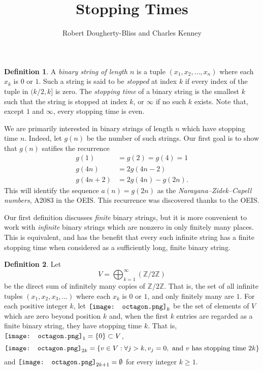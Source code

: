 \documentclass[12pt]{amsart}
\title{Stopping Times}
\author{Robert Dougherty-Bliss and Charles Kenney}
\newcommand*\oct{\vcenter{\hbox{\texttt{[image: octagon.png]}}}}
\newcommand{\Z}{\mathbb{Z}}
\theoremstyle{definition}
\newtheorem{definition}{Definition}
\begin{document}
\maketitle

\begin{definition}
    A \emph{binary string of length $n$} is a tuple $(x_1, x_2, \dots, x_n)$
    where each $x_k$ is $0$ or $1$. Such a string is said to be \emph{stopped}
    at index $k$ if every index of the tuple in $(k / 2, k]$ is zero. The
    \emph{stopping time} of a binary string is the smallest $k$ such that the
    string is stopped at index $k$, or $\infty$ if no such $k$ exists. Note
    that, except $1$ and $\infty$, every stopping time is even.
\end{definition}

We are primarily interested in binary strings of length $n$ which have stopping
time $n$. Indeed, let $g(n)$ be the number of such strings. Our first goal is
to show that $g(n)$ satifies the recurrence
\begin{align*}
    g(1) &= g(2) = g(4) = 1 \\
    g(4n) &= 2 g(4n - 2) \\
    g(4n + 2) &= 2 g(4n) - g(2n).
\end{align*}
This will identify the sequence $a(n) = g(2n)$ as the
\emph{Narayana--Zidek--Capell numbers}, A2083 in the OEIS. This recurrence was
discovered thanks to the OEIS.

Our first definition discusses \emph{finite} binary strings, but it is more
convenient to work with \emph{infinite} binary strings which are nonzero in
only finitely many places. This is equivalent, and has the benefit that every
such infinite string has a finite stopping time when considered as a
sufficiently long, finite binary string.

\begin{definition}
    Let
    \begin{equation*}
        V = \bigoplus_{k=1}^\infty (\Z/2\Z)
    \end{equation*}
    be the direct sum of infinitely many copies of $\Z / 2\Z$. That is, the set
    of all infinite tuples $(x_1, x_2, x_3, \dots)$ where each $x_k$ is $0$ or
    $1$, and only finitely many are $1$. For each positive integer $k$, let
    $\oct_k$ be the set of elements of $V$ which are zero beyond position $k$
    and, when the first $k$ entries are regarded as a finite binary string,
    they have stopping time $k$. That is, $\oct_1 = \{0\} \subset V$,
    \begin{equation*}
        \oct_{2k} = \{v \in V : \forall j > k, v_j = 0, \text{ and } v \text{ has stopping time } 2k \}
    \end{equation*}
    and $\oct_{2k + 1} = \emptyset$ for every integer $k \geq 1$.
\end{definition}
\end{document}
